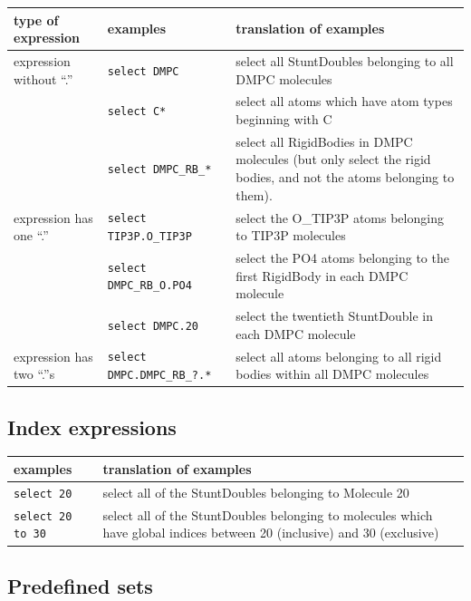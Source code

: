 \documentclass[letterpaper]{report}
\begin{document}
\begin{center}
\begin{tabular}{|llp{3in}|}
\hline
{\bf type of expression} & {\bf examples} & {\bf translation of
examples} \\
\hline
expression without ``.'' & {\tt select DMPC} & select all StuntDoubles
belonging to all DMPC molecules \\
 & {\tt select C*} & select all atoms which have atom types beginning with C
\\
 & {\tt select DMPC\_RB\_*} & select all RigidBodies in DMPC molecules (but
only select the rigid bodies, and not the atoms belonging to them). \\
\hline
expression has one ``.'' & {\tt select TIP3P.O\_TIP3P} & select the O\_TIP3P
atoms belonging to TIP3P molecules \\
 & {\tt select DMPC\_RB\_O.PO4} & select the PO4 atoms belonging to
the first 
RigidBody in each DMPC molecule \\
 & {\tt select DMPC.20} & select the twentieth StuntDouble in each DMPC
molecule \\
\hline
expression has two ``.''s & {\tt select DMPC.DMPC\_RB\_?.*} &
select all atoms 
belonging to all rigid bodies within all DMPC molecules \\
\hline
\end{tabular}
\end{center}

\subsection{\label{section:index}Index expressions}

\begin{center}
\begin{tabular}{|lp{4in}|}
\hline
{\bf examples} & {\bf translation of examples} \\
\hline
{\tt select 20} & select all of the StuntDoubles belonging to Molecule 20 \\
{\tt select 20 to 30} & select all of the StuntDoubles belonging to
molecules which have global indices between 20 (inclusive) and 30
(exclusive) \\
\hline
\end{tabular}
\end{center}

\subsection{\label{section:predefined}Predefined sets}
\end{document}
